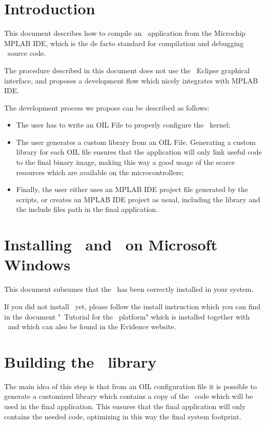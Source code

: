 \chapter{Introduction}

This document describes how to compile an \ee\ application from the
Microchip MPLAB IDE, which is the de facto standard for compilation
and debugging \dspic\ source code.

The procedure described in this document does not use the \rtd\
Eclipse graphical interface, and proposes a development flow which
nicely integrates with MPLAB IDE.

The development process we propose can be described as follows:
\begin{itemize}

\item The user has to write an OIL File to properly configure the \ee\
	kernel;

\item The user generates a custom library from an OIL File. Generating
	a custom library for each OIL file ensures that the
	application will only link useful code to the final binary
	image, making this way a good usage of the scarce resources
	which are available on the microcontrollers;

\item Finally, the user either uses an MPLAB IDE project file
	generated by the scripts, or creates an MPLAB IDE project as
	usual, including the library and the include files path in the
	final application.
\end{itemize}

\chapter{Installing \ee\ and \rtd\ on Microsoft Windows}
\label{cha:installing}

This document subsumes that the \ee\ has been correctly installed in
your system.

If you did not install \ee\ yet, please follow the install instruction
which you can find in the document "\ee\ Tutorial for the \dspic\
platform" which is installed together with \ee\ and which can also be
found in the Evidence website.

\chapter{Building the \ee\ library}

The main idea of this step is that from an OIL configuration file it
is possible to generate a customized library which contains a copy of
the \ee\ code which will be used in the final application. This
ensures that the final application will only contains the needed code,
optimizing in this way the final system footprint.

